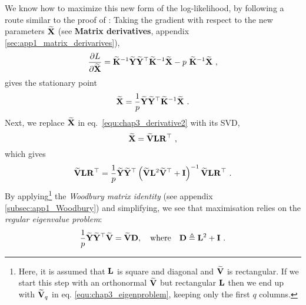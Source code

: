       We know how to maximize this new form of the log-likelihood, by following a route similar to the proof of \citet{Tipping:ppca96}: Taking the gradient with respect to the new parameters $\widetilde{\mathbf{X}}$ (see \textbf{Matrix derivatives}, appendix \ref{sec:app1_matrix_derivarives}),
      \begin{equation*}
        \frac{\partial L}{\partial \widetilde{\mathbf{X}}}
	= \widetilde{\mathbf{K}}^{-1} \widetilde{\mathbf{Y}} \widetilde{\mathbf{Y}}^\top \widetilde{\mathbf{K}}^{-1} \widetilde{\mathbf{X}} - p~ \widetilde{\mathbf{K}}^{-1} \widetilde{\mathbf{X}} ~,
      \end{equation*}
      gives the stationary point
      \begin{equation}  \label{equ:chap3_derivative2}
	\widetilde{\mathbf{X}} = \frac{1}{p} \widetilde{\mathbf{Y}} \widetilde{\mathbf{Y}}^\top \widetilde{\mathbf{K}}^{-1} \widetilde{\mathbf{X}} ~.
      \end{equation}
      Next, we replace $\widetilde{\mathbf{X}}$ in eq.~\eqref{equ:chap3_derivative2} with its SVD,
      \begin{equation} \label{equ:chap3_latentdecomp}
	\widetilde{\mathbf{X}} = \widetilde{\mathbf{V}} \mathbf{L} \mathbf{R}^\top ~,
      \end{equation}
      which gives
      \begin{equation*}
	\widetilde{\mathbf{V}}\mathbf{L}\mathbf{R}^\top
	= \frac{1}{p} \widetilde{\mathbf{Y}} \widetilde{\mathbf{Y}}^\top \left( \widetilde{\mathbf{V}} \mathbf{L}^{2} \widetilde{\mathbf{V}}^\top + \mathbf{I} \right)^{-1} \widetilde{\mathbf{V}} \mathbf{L} \mathbf{R}^\top ~.
      \end{equation*}
      By applying\footnote{Here, it is assumed that $\mathbf{L}$ is square and diagonal and $\widetilde{\mathbf{V}}$ is rectangular. If we start this step with an orthonormal $\widetilde{\mathbf{V}}$ but rectangular $\mathbf{L}$
      then we end up with $\widetilde{\mathbf{V}}_q$ in eq. \eqref{equ:chap3_eigenproblem},
      keeping only the first $q$ columns.}
      the \emph{Woodbury matrix identity} (see appendix \ref{subsec:app1_Woodbury}) and simplifying, we see that maximisation relies on the \emph{regular eigenvalue problem}:
      \begin{equation}\label{equ:chap3_eigenproblem}
        \begin{split}
	  \frac{1}{p} \widetilde{\mathbf{Y}} \widetilde{\mathbf{Y}}^\top \widetilde{\mathbf{V}} = \widetilde{\mathbf{V}} \mathbf{D},
	  \quad \textrm{where} \quad \mathbf{D} \triangleq \mathbf{L}^{2} + \mathbf{I} ~.
        \end{split}
      \end{equation}
